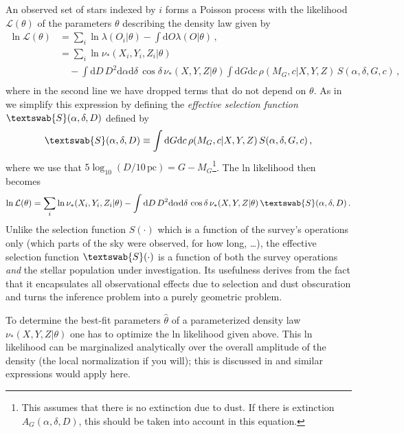 \documentclass[12pt,preprint]{aastex}
\newcommand{\dd}{\mathrm{d}}
\newcommand{\dens}{\ensuremath{\nu_*}}
\newcommand{\ra}{\ensuremath{\alpha}}
\newcommand{\dec}{\ensuremath{\delta}}
\newcommand{\essf}{\ensuremath{\textswab{S}}}
\newcommand{\pc}{\ensuremath{\,\mathrm{pc}}}
\begin{document}
An observed set of stars indexed by $i$ forms a Poisson process with
the likelihood $\mathcal{L}(\theta)$ of the parameters $\theta$
describing the density law given by
\begin{equation}
\begin{split}
  \ln \mathcal{L}(\theta) & = \sum_i \ln \lambda(O_i|\theta) -\int \dd O
  \lambda(O|\theta)\,,\\ & = \sum_i \ln \dens(X_i,Y_i,Z_i|\theta)\\
  & \quad -\int \dd D\, D^2\dd \ra \dd \dec
    \,\cos\dec\,\dens(X,Y,Z|\theta)\int \dd G \dd c
      \,\rho(M_G,c|X,Y,Z)\,S(\ra,\dec,G,c)\,,\\
\end{split}
\end{equation}
where in the second line we have dropped terms that do not depend on
$\theta$.  As in \citet{Bovy16a} we simplify this expression by
defining the \emph{effective selection function} $\essf(\ra,\dec,D)$
defined by
\begin{equation}
  \essf(\ra,\dec,D) \equiv \int \dd G \dd c \,\rho(M_G,c|X,Y,Z)\,S(\ra,\dec,G,c)\,,
\end{equation}
where we use that $5\log_{10}\left(D/10\pc\right) =
G-M_G$\footnote{This assumes that there is no extinction due to
  dust. If there is extinction $A_G(\ra,\dec,D)$, this should be taken
  into account in this equation.}. The ln likelihood then becomes
\begin{equation}
  \ln \mathcal{L}(\theta) = \sum_i \ln \dens(X_i,Y_i,Z_i|\theta)
  -\int \dd D\, D^2\dd \ra \dd \dec
    \,\cos\dec\,\dens(X,Y,Z|\theta)\,\essf(\ra,\dec,D)\,.\\
\end{equation}
Unlike the selection function $S(\cdot)$ which is a function of the
survey's operations only (which parts of the sky were observed, for
how long, \ldots), the effective selection function $\essf(\cdot)$ is
a function of both the survey operations \emph{and} the stellar
population under investigation. Its usefulness derives from the fact
that it encapsulates all observational effects due to selection and
dust obscuration and turns the inference problem into a purely
geometric problem.

To determine the best-fit parameters $\hat{\theta}$ of a parameterized
density law $\dens(X,Y,Z|\theta)$ one has to optimize the ln likelihood
given above. This ln likelihood can be marginalized analytically over
the overall amplitude of the density (the local normalization if you
will); this is discussed in \citet{Bovy16a} and similar expressions
would apply here.
\end{document}
